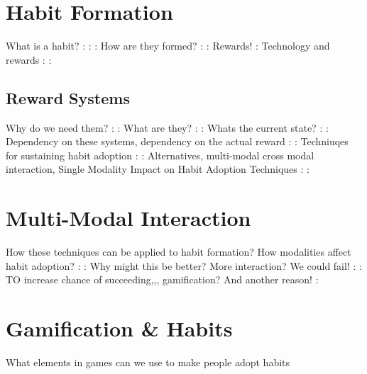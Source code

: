 \newpage
\section{Habit Formation}
What is a habit?
:\newline
:\newline
:\newline
How are they formed?
:\newline
:\newline
Rewards!
:\newline
Technology and rewards
:\newline
:\newline


\subsection{Reward Systems}
Why do we need them?
:\newline
:\newline
What are they?
:\newline
:\newline
Whats the current state?
:\newline
:\newline
Dependency on these systems, dependency on the actual reward
:\newline
:\newline
Techniuqes for sustaining habit adoption
:\newline
:\newline
Alternatives, multi-modal cross modal interaction, Single Modality Impact on Habit Adoption Techniques
:\newline
:\newline


\newpage
\section{Multi-Modal Interaction}
How these techniques can be applied to habit formation? How modalities affect habit adoption?
:\newline
:\newline
Why might this be better? More interaction? We could fail!
:\newline
:\newline
TO increase chance of succeeding,,, gamification? And another reason!
:\newline


\newpage

\section{Gamification \& Habits}
What elements in games can we use to make people adopt habits

